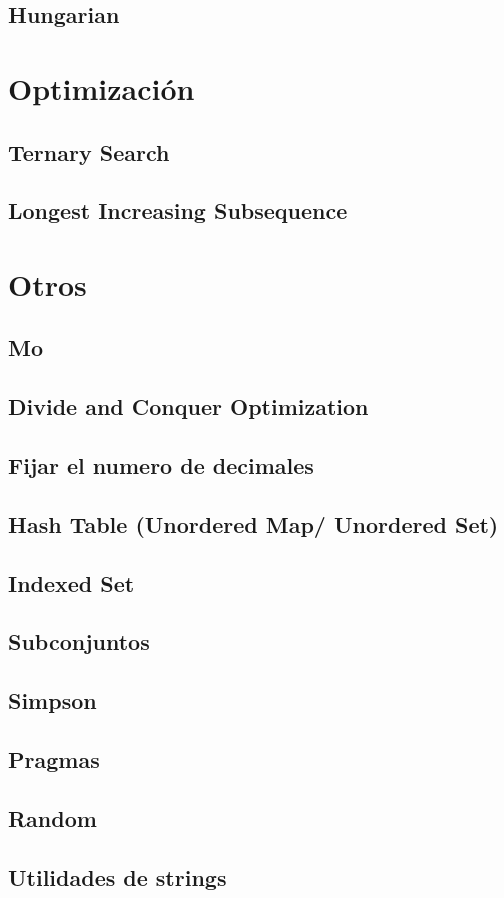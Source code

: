 \documentclass[a4paper,11pt,landscape,twocolumn]{article}
\begin{document}
\subsection{Hungarian}


\section{Optimización} %
\subsection{Ternary Search}

\subsection{Longest Increasing Subsequence}


\section{Otros} %
\subsection{Mo}

\subsection{Divide and Conquer Optimization}

\subsection{Fijar el numero de decimales}

\subsection{Hash Table (Unordered Map/ Unordered Set)}

\subsection{Indexed Set}

\subsection{Subconjuntos}

\subsection{Simpson}

\subsection{Pragmas}

\subsection{Random}

\subsection{Utilidades de strings}

\end{document}
